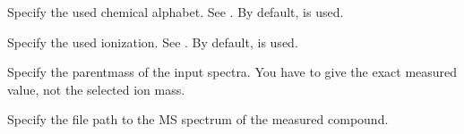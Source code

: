 \documentclass[letterpaper,10pt,openany,oneside]{sphinxmanual}
\begin{document}
\begin{fulllineitems}
\label{commandline:cmdoption-e}
Specify the used chemical alphabet. See {\hyperref[commandline:alphabets]{}}. By default,  is used.

\end{fulllineitems}


\begin{fulllineitems}
\label{commandline:cmdoption-i}
Specify the used ionization. See {\hyperref[commandline:ions]{}}. By default, \code{{[}M+H{]}+} is used.

\end{fulllineitems}


\begin{fulllineitems}
\label{commandline:cmdoption-z}
Specify the parentmass of the input spectra. You have to give the exact measured value, not the selected ion mass.

\end{fulllineitems}


\begin{fulllineitems}
\label{commandline:cmdoption-1}
Specify the file path to the MS spectrum of the measured compound.

\end{fulllineitems}
\end{document}
